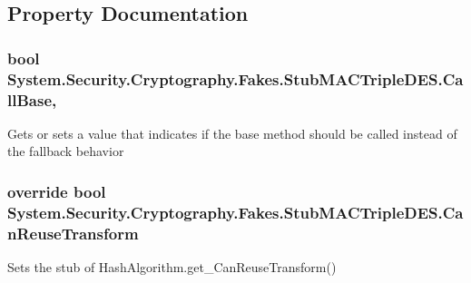 \subsection{Property Documentation}
\hypertarget{class_system_1_1_security_1_1_cryptography_1_1_fakes_1_1_stub_m_a_c_triple_d_e_s_ad36772be2093a7b4f7f0aa3cd4963664}{
\subsubsection[{Call\-Base}]{\setlength{\rightskip}{0pt plus 5cm}bool System.\-Security.\-Cryptography.\-Fakes.\-Stub\-M\-A\-C\-Triple\-D\-E\-S.\-Call\-Base\hspace{0.3cm}{\ttfamily [get]}, {\ttfamily [set]}}}\label{class_system_1_1_security_1_1_cryptography_1_1_fakes_1_1_stub_m_a_c_triple_d_e_s_ad36772be2093a7b4f7f0aa3cd4963664}


Gets or sets a value that indicates if the base method should be called instead of the fallback behavior

\hypertarget{class_system_1_1_security_1_1_cryptography_1_1_fakes_1_1_stub_m_a_c_triple_d_e_s_ac1793d10709682868878451825398d5e}{
\subsubsection[{Can\-Reuse\-Transform}]{\setlength{\rightskip}{0pt plus 5cm}override bool System.\-Security.\-Cryptography.\-Fakes.\-Stub\-M\-A\-C\-Triple\-D\-E\-S.\-Can\-Reuse\-Transform\hspace{0.3cm}{\ttfamily [get]}}}\label{class_system_1_1_security_1_1_cryptography_1_1_fakes_1_1_stub_m_a_c_triple_d_e_s_ac1793d10709682868878451825398d5e}


Sets the stub of Hash\-Algorithm.\-get\-\_\-\-Can\-Reuse\-Transform()

